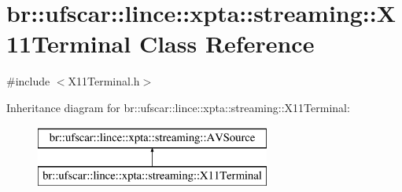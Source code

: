 \hypertarget{classbr_1_1ufscar_1_1lince_1_1xpta_1_1streaming_1_1X11Terminal}{
\section{br::ufscar::lince::xpta::streaming::X11Terminal Class Reference}
\label{classbr_1_1ufscar_1_1lince_1_1xpta_1_1streaming_1_1X11Terminal}
}


{\ttfamily \#include $<$X11Terminal.h$>$}

Inheritance diagram for br::ufscar::lince::xpta::streaming::X11Terminal:\begin{figure}[H]
\begin{center}
\leavevmode
\includegraphics[height=2cm]{classbr_1_1ufscar_1_1lince_1_1xpta_1_1streaming_1_1X11Terminal}
\end{center}
\end{figure}
